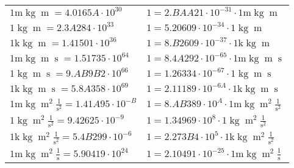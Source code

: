 \begin{center}
\begin{longtable}{l l}
{\color{gray}$1 \bm{\mathrm{ m}}\operatorname{kg}{\operatorname{m}}{}{}{} = 4.0165A\cdot10^{30} $}   & {\color{gray}$ 1 = 2.BAA21\cdot10^{-31} \cdot 1 \bm{\mathrm{ m}}\operatorname{kg}{\operatorname{m}}{}{}{}$}  \\
{\color{black}$1 \bm{\mathrm{ }}\operatorname{kg}{\operatorname{m}}{}{}{} = 2.3A284\cdot10^{33} $}   & {\color{black}$ 1 = 5.20609\cdot10^{-34} \cdot 1 \bm{\mathrm{ }}\operatorname{kg}{\operatorname{m}}{}{}{}$}  \\
{\color{gray}$1 \bm{\mathrm{ k}}\operatorname{kg}{\operatorname{m}}{}{}{} = 1.41501\cdot10^{36} $}   & {\color{gray}$ 1 = 8.B2609\cdot10^{-37} \cdot 1 \bm{\mathrm{ k}}\operatorname{kg}{\operatorname{m}}{}{}{}$}  \\
{\color{gray}$1 \bm{\mathrm{ m}}\operatorname{kg}{\operatorname{m}}{\operatorname{s}}{}{} = 1.51735\cdot10^{64} $}   & {\color{gray}$ 1 = 8.4A292\cdot10^{-65} \cdot 1 \bm{\mathrm{ m}}\operatorname{kg}{\operatorname{m}}{\operatorname{s}}{}{}$}  \\
{\color{black}$1 \bm{\mathrm{ }}\operatorname{kg}{\operatorname{m}}{\operatorname{s}}{}{} = 9.AB9B2\cdot10^{66} $}   & {\color{black}$ 1 = 1.26334\cdot10^{-67} \cdot 1 \bm{\mathrm{ }}\operatorname{kg}{\operatorname{m}}{\operatorname{s}}{}{}$}  \\
{\color{gray}$1 \bm{\mathrm{ k}}\operatorname{kg}{\operatorname{m}}{\operatorname{s}}{}{} = 5.8A358\cdot10^{69} $}   & {\color{gray}$ 1 = 2.11189\cdot10^{-6A} \cdot 1 \bm{\mathrm{ k}}\operatorname{kg}{\operatorname{m}}{\operatorname{s}}{}{}$}  \\
{\color{gray}$1 \bm{\mathrm{ m}}\operatorname{kg}{\operatorname{m}^2}\frac1{\operatorname{s}^2}{}{} = 1.41A95\cdot10^{-B} $}   & {\color{gray}$ 1 = 8.AB389\cdot10^{A} \cdot 1 \bm{\mathrm{ m}}\operatorname{kg}{\operatorname{m}^2}\frac1{\operatorname{s}^2}{}{}$}  \\
{\color{black}$1 \bm{\mathrm{ }}\operatorname{kg}{\operatorname{m}^2}\frac1{\operatorname{s}^2}{}{} = 9.42625\cdot10^{-9} $}   & {\color{black}$ 1 = 1.34969\cdot10^{8} \cdot 1 \bm{\mathrm{ }}\operatorname{kg}{\operatorname{m}^2}\frac1{\operatorname{s}^2}{}{}$}  \\
{\color{gray}$1 \bm{\mathrm{ k}}\operatorname{kg}{\operatorname{m}^2}\frac1{\operatorname{s}^2}{}{} = 5.4B299\cdot10^{-6} $}   & {\color{gray}$ 1 = 2.273B4\cdot10^{5} \cdot 1 \bm{\mathrm{ k}}\operatorname{kg}{\operatorname{m}^2}\frac1{\operatorname{s}^2}{}{}$}  \\
{\color{gray}$1 \bm{\mathrm{ m}}\operatorname{kg}{\operatorname{m}^2}\frac1{\operatorname{s}}{}{} = 5.90419\cdot10^{24} $}   & {\color{gray}$ 1 = 2.10491\cdot10^{-25} \cdot 1 \bm{\mathrm{ m}}\operatorname{kg}{\operatorname{m}^2}\frac1{\operatorname{s}}{}{}$}  \\

\end{longtable}
\end{center}
